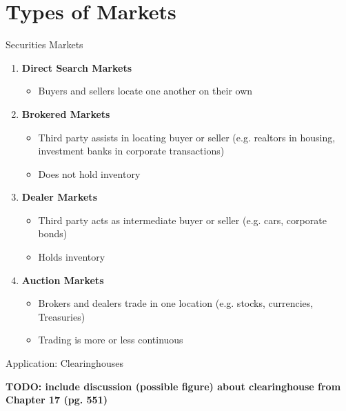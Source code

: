 \documentclass{beamer}
\begin{document}
\section{Types of Markets}
\begin{frame}{Securities Markets}
	\begin{enumerate}
		\item \textbf{Direct Search Markets}
		\begin{itemize}
			\item Buyers and sellers locate one another on their own 
		\end{itemize}
			\item \textbf{Brokered Markets}
		\begin{itemize}
			\item Third party assists in locating buyer or seller (e.g. realtors in housing, investment banks in corporate transactions)
			\item Does not hold inventory
		\end{itemize}
		\item \textbf{Dealer Markets}
		\begin{itemize}
			\item Third party acts as intermediate buyer or seller (e.g. cars, corporate bonds)
			\item Holds inventory
		\end{itemize}
		\item \textbf{Auction Markets}
		\begin{itemize}
			\item Brokers and dealers trade in one location (e.g. stocks, currencies, Treasuries)
			\item Trading is more or less continuous
		\end{itemize}
	\end{enumerate}
\end{frame}

\begin{frame}{Application: Clearinghouses}
	\begin{center}
		\textbf{TODO: include discussion (possible figure) about clearinghouse from Chapter 17 (pg. 551)}
	\end{center}
\end{frame}

\end{document}
